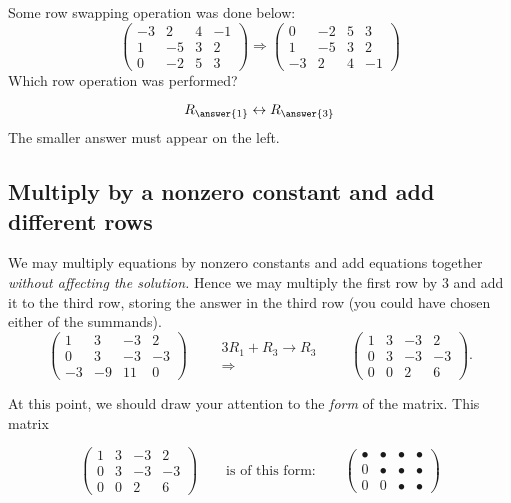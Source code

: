 \documentclass{ximera}
\begin{document}
\begin{question}
  Some row swapping operation was done below:
  \[
  \begin{pmatrix}
-3 & 2 & 4 & -1 \\
1 & -5 & 3 & 2 \\
0 & -2 & 5 & 3
  \end{pmatrix}
  \Rightarrow
  \begin{pmatrix}
0 & -2 & 5 & 3 \\
1 & -5 & 3 & 2 \\
-3 & 2 & 4 & -1
\end{pmatrix}
  \]
  Which row operation was performed?
  \begin{prompt}
    \[
    R_{\answer{1}} \leftrightarrow R_{\answer{3}}
    \]
    The smaller answer must appear on the left.
  \end{prompt}
\end{question}

  
\subsection{Multiply by a nonzero constant and add different rows} 
We may multiply equations by nonzero constants and add equations together
\emph{without affecting the solution.} Hence we may multiply the first
row by $3$ and add it to the third row, storing the answer in the
third row (you could have chosen either of the summands).
\[
\left(\begin{array}{ccc|c}
  1 &   3 & -3 & 2  \\
  0 &   3 & -3 & -3 \\
  -3& -9  & 11 & 0
\end{array}\right)
\qquad
\begin{array}{c}
  3R_1+R_3\rightarrow R_3\\\Longrightarrow
\end{array}
\qquad
\left(\begin{array}{ccc|c}
  1 &   3 & -3 & 2  \\
  0 &   3 & -3 & -3 \\
  0& 0  & 2 & 6
\end{array}\right).
\]

\begin{question}
\end{question}



At this point, we should draw your attention to the \emph{form} of the matrix. This matrix

\[
\begin{pmatrix}
  1 &   3 & -3 & 2  \\
  0 &   3 & -3 & -3 \\
  0& 0  & 2 & 6
\end{pmatrix}
\qquad
\text{is of this form:}
\qquad
\begin{pmatrix}
  \bullet & \bullet & \bullet & \bullet \\
     0   & \bullet & \bullet & \bullet \\
     0  &    0 & \bullet & \bullet 
\end{pmatrix}
\]
\end{document}
